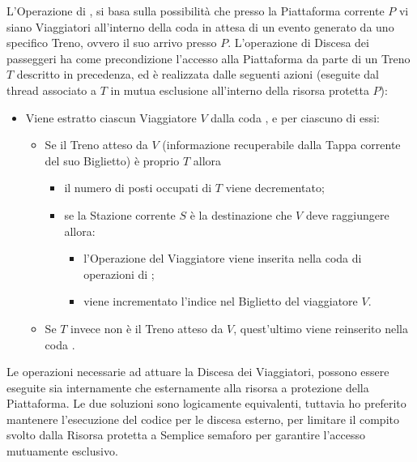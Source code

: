 \begin{description}
		L'Operazione di , si basa sulla possibilità che presso la Piattaforma corrente $P$ vi siano Viaggiatori all'interno della coda  in attesa di un evento generato da uno specifico Treno, ovvero il suo arrivo presso $P$. L'operazione di Discesa dei passeggeri ha come precondizione l'accesso alla Piattaforma da parte di un Treno $T$ descritto in precedenza, ed è realizzata dalle seguenti azioni (eseguite dal thread associato a $T$ in mutua esclusione all'interno della risorsa protetta $P$):
		\begin{itemize}
			\item Viene estratto ciascun Viaggiatore $V$ dalla coda , e per ciascuno di essi:
			\begin{itemize}
				\item Se il Treno atteso da $V$ (informazione recuperabile dalla Tappa corrente del suo Biglietto) è proprio $T$ allora
					\begin{itemize}
						\item il numero di posti occupati di $T$ viene decrementato;
						\item se la Stazione corrente $S$  è la destinazione che $V$ deve raggiungere allora:
							\begin{itemize}
								\item l'Operazione  del Viaggiatore viene inserita nella coda di operazioni di ;
								\item viene incrementato l'indice  nel Biglietto del viaggiatore $V$.
							\end{itemize}
					\end{itemize}
				\item Se $T$ invece non è il Treno atteso da $V$, quest'ultimo viene reinserito nella coda .
			\end {itemize}
		\end{itemize}
		
	Le operazioni necessarie ad attuare la Discesa dei Viaggiatori, possono essere eseguite sia internamente che esternamente alla risorsa a protezione della Piattaforma. Le due soluzioni sono logicamente equivalenti, tuttavia ho preferito mantenere l'esecuzione del codice per le discesa esterno, per limitare il compito svolto dalla Risorsa protetta a Semplice semaforo per garantire l'accesso mutuamente esclusivo.
	
	\item{}\\


\end{description}
